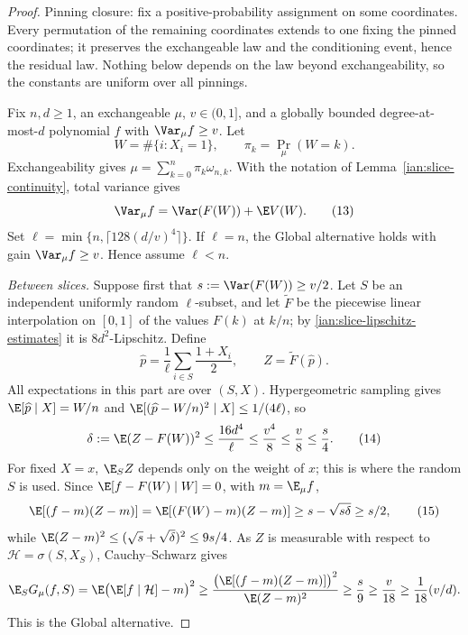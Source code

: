 \begin{proof}
Pinning closure: fix a positive-probability assignment on some
coordinates. Every permutation of the remaining coordinates extends to
one fixing the pinned coordinates; it preserves the exchangeable law and
the conditioning event, hence the residual law. Nothing below depends on
the law beyond exchangeability, so the constants are uniform over all
pinnings.

Fix \(n,d\ge1\), an exchangeable \(\mu\), \(v\in(0,1]\), and a
globally bounded degree-at-most-\(d\) polynomial \(f\) with
\(\Var_\mu f\ge v\). Let
\[
 W=\#\{i:X_i=1\},\qquad
 \pi_k=\Pr_\mu(W=k).
\]
Exchangeability gives
\(\mu=\sum_{k=0}^n\pi_k\omega_{n,k}\). With the notation of
Lemma~\ref{ian:slice-continuity}, total variance gives
\[
 \Var_\mu f=\Var(F(W))+\E V(W).
 \tag{13}\label{ian:exchangeable-variance-split}
\]
Set \(\ell=\min\{n,\lceil128(d/v)^4\rceil\}\).
If \(\ell=n\), the Global alternative holds with gain
\(\Var_\mu f\ge v\). Hence assume \(\ell<n\).

\emph{Between slices.} Suppose first that \(s:=\Var(F(W))\ge v/2\).
Let \(S\) be an independent uniformly random \(\ell\)-subset, and let
\(\widetilde F\) be the piecewise linear interpolation on \([0,1]\) of
the values \(F(k)\) at \(k/n\); by
\eqref{ian:slice-lipschitz-estimates} it is \(8d^2\)-Lipschitz. Define
\[
 \widehat p=\frac1\ell\sum_{i\in S}\frac{1+X_i}{2},
 \qquad Z=\widetilde F(\widehat p).
\]
All expectations in this part are over \((S,X)\). Hypergeometric
sampling gives
\(\E[\widehat p\mid X]=W/n\) and
\(\E[(\widehat p-W/n)^2\mid X]\le1/(4\ell)\), so
\[
 \delta:=\E(Z-F(W))^2
 \le\frac{16d^4}{\ell}
 \le\frac{v^4}{8}\le\frac v8\le\frac s4.
 \tag{14}\label{ian:density-estimation-error}
\]
For fixed \(X=x\), \(\E_S Z\) depends only on the weight of \(x\);
this is where the random \(S\) is used. Since
\(\E[f-F(W)\mid W]=0\), with \(m=\E_\mu f\),
\[
 \E[(f-m)(Z-m)]
 =\E[(F(W)-m)(Z-m)]
 \ge s-\sqrt{s\delta}\ge s/2,
 \tag{15}\label{ian:between-slice-covariance}
\]
while \(\E(Z-m)^2\le(\sqrt s+\sqrt\delta)^2\le9s/4\). As \(Z\) is
measurable with respect to \(\mathcal H=\sigma(S,X_S)\),
Cauchy--Schwarz gives
\[
 \E_S G_\mu(f,S)
 =\E\bigl(\E[f\mid\mathcal H]-m\bigr)^2
 \ge
 \frac{\bigl(\E[(f-m)(Z-m)]\bigr)^2}{\E(Z-m)^2}
 \ge \frac s9\ge\frac v{18}\ge\frac1{18}(v/d).
\]
This is the Global alternative.


\end{proof}
